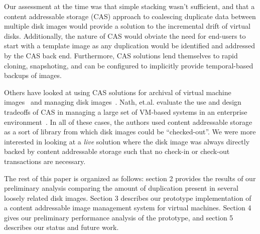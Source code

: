 Our assessment at the time was that simple stacking wasn't sufficient,
and that a content addressable storage (CAS) approach to coalescing 
duplicate data between multiple disk images would provide a solution to 
the incremental drift of virtual disks.  
Additionally, the nature of CAS would obviate the
need for end-users to start with a template image as any duplication would
be identified and addressed by the CAS back end.
Furthermore, CAS solutions lend themselves to rapid cloning, snapshoting,
and can be configured to implicitly provide temporal-based backups of images.

Others have looked at using CAS solutions for archival of virtual machine
images~\cite{foundation} and managing disk images~\cite{mirage}.  
Nath, et.al. evaluate the use and design tradeoffs of CAS
in managing a large set of VM-based systems in an enterprise 
environment~\cite{nath}.
In all of these cases, the authors used content addressable storage as a 
sort of library from which disk images could be ``checked-out''.  
We were more interested in looking at a \emph{live} solution where the 
disk image was always directly backed by content addressable storage such 
that no check-in or check-out transactions are necessary. 

The rest of this paper is organized as follows: section 2 provides the results
of our preliminary analysis comparing the amount of duplication present in
several loosely related disk images.
Section 3 describes our prototype implementation of a content addressable
image management system for virtual machines.
Section 4 gives our preliminary performance analysis of the prototype,
and section 5 describes our status and future work.
